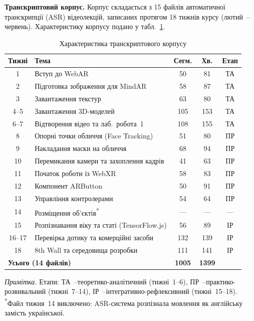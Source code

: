 \textbf{Транскриптовий корпус.} Корпус складається з 15 файлів автоматичної транскрипції (ASR) відеолекцій, записаних протягом 18 тижнів курсу (лютий~--червень). Характеристику корпусу подано у табл.~\ref{tab:corpus}.

\begin{table}[!h]
\centering
\caption{Характеристика транскриптового корпусу}
\label{tab:corpus}
\small
\begin{tabular}{|c|p{5.5cm}|c|c|c|}
\hline
\textbf{Тижні} & \textbf{Тема} & \textbf{Сегм.} & \textbf{Хв.} & \textbf{Етап} \\
\hline
1 & Вступ до WebAR & 50 & 81 & ТА \\
\hline
2 & Підготовка зображення для MindAR & 58 & 87 & ТА \\
\hline
3 & Завантаження текстур & 63 & 80 & ТА \\
\hline
4--5 & Завантаження 3D-моделей & 105 & 153 & ТА \\
\hline
6--7 & Відтворення відео та лаб.~робота~1 & 108 & 155 & ТА \\
\hline
8 & Опорні точки обличчя (Face Tracking) & 51 & 80 & ПР \\
\hline
9 & Накладання маски на обличчя & 68 & 94 & ПР \\
\hline
10 & Перемикання камери та захоплення кадрів & 41 & 63 & ПР \\
\hline
11 & Початок роботи із WebXR & 58 & 83 & ПР \\
\hline
12 & Компонент ARButton & 50 & 91 & ПР \\
\hline
13 & Управління контролерами & 54 & 64 & ПР \\
\hline
14 & Розміщення об'єктів\textsuperscript{*} & --- & --- & --- \\
\hline
15 & Розпізнавання віку та статі (TensorFlow.js) & 56 & 89 & ІР \\
\hline
16--17 & Перевірка дотику та комерційні засоби & 132 & 139 & ІР \\
\hline
18 & 8th Wall та середовища розробки & 111 & 141 & ІР \\
\hline
\multicolumn{2}{|l|}{\textbf{Усього (14 файлів)}} & \textbf{1005} & \textbf{1399} & \\
\hline
\end{tabular}

\medskip
\footnotesize
\textit{Примітка.} Етапи: ТА~--теоретико-аналітичний (тижні~1--6), ПР~--практико-розвивальний (тижні~7--14), ІР~--інтегративно-рефлексивний (тижні~15--18). \textsuperscript{*}Файл тижня~14 виключено: ASR-система розпізнала мовлення як англійську замість української.
\end{table}

